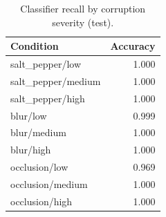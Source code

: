 \begin{table}[t]
\centering
\caption{Classifier recall by corruption severity (test).}
\label{tab:t2_cls_levels}
\footnotesize
\begin{tabular}{lr}
\toprule
Condition & Accuracy \\
\midrule
salt\_pepper/low & 1.000 \\
salt\_pepper/medium & 1.000 \\
salt\_pepper/high & 1.000 \\
blur/low & 0.999 \\
blur/medium & 1.000 \\
blur/high & 1.000 \\
occlusion/low & 0.969 \\
occlusion/medium & 1.000 \\
occlusion/high & 1.000 \\
\bottomrule
\end{tabular}
\end{table}
